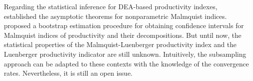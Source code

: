 Regarding the statistical inference for DEA-based productivity indexes, \cite{simar2019} established the asymptotic theorems for nonparametric Malmquist indices. \cite{simar1999}  proposed a bootstrap estimation procedure for obtaining confidence intervals for Malmquist indices of productivity and their decompositions. But until now, the statistical properties of the Malmquist-Luenberger productivity index and the Luenberger productivity indicator are still unknown. Intuitively, the subsampling approach can be adapted to these contexts with the knowledge of the convergence rates. Nevertheless, it is still an open issue. 


\endinput
